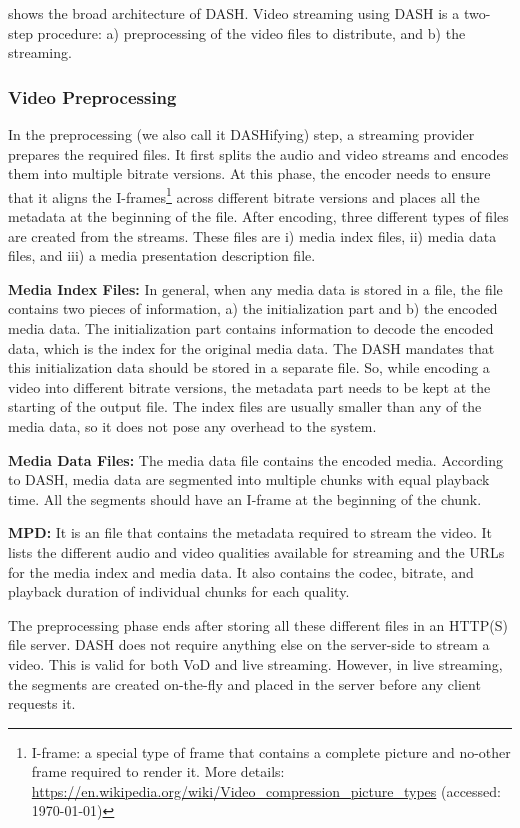 \fig{\ref{fig:dash}} shows the broad architecture of \ac{DASH}. Video streaming using DASH is a two-step procedure: a) preprocessing of the video files to distribute, and b) the streaming. 


\subsubsection{Video Preprocessing}
In the preprocessing (we also call it DASHifying) step, a streaming provider prepares the required files. It first splits the audio and video streams and encodes them into multiple bitrate versions. At this phase, the encoder needs to ensure that it aligns the I-frames\footnote{I-frame: a special type of frame that contains a complete picture and no-other frame required to render it. More details: \url{https://en.wikipedia.org/wiki/Video_compression_picture_types} (accessed: \today)} across different bitrate versions and places all the metadata at the beginning of the file. After encoding, three different types of files are created from the streams. These files are i) media index files, ii) media data files, and iii) a media presentation description file.

{\bf Media Index Files:} In general, when any media data is stored in a file, the file contains two pieces of information, a) the initialization part and b) the encoded media data. The initialization part contains information to decode the encoded data, which is the index for the original media data. The \ac{DASH} mandates that this initialization data should be stored in a separate file. So, while encoding a video into different bitrate versions, the metadata part needs to be kept at the starting of the output file. The index files are usually smaller than any of the media data, so it does not pose any overhead to the system.

{\bf Media Data Files:} The media data file contains the encoded media. According to \ac{DASH}, media data are segmented into multiple chunks with equal playback time. All the segments should have an I-frame at the beginning of the chunk.

{\bf \ac{MPD}:} It is an {\tt {}} file that contains the metadata required to stream the video. It lists the different audio and video qualities available for streaming and the \acsp{URL} for the media index and media data. It also contains the codec, bitrate, and playback duration of individual chunks for each quality.

The preprocessing phase ends after storing all these different files in an \ac{HTTP(S)} file server. DASH does not require anything else on the server-side to stream a video. This is valid for both \ac{VoD} and live streaming. However, in live streaming, the segments are created on-the-fly and placed in the server before any client requests it.

